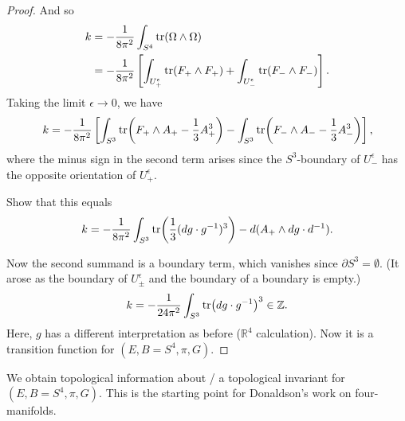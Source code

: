 \begin{proof}
  And so
  \begin{align}
    k &= -\frac{1}{8 \pi^2} \int_{S^4} \tr(\Omega \wedge \Omega) \\
      &= -\frac{1}{8 \pi^2} \left[ \int_{U_+^{\epsilon}} \tr(F_+ \wedge F_+) + \int_{U_-^{\epsilon}} \tr(F_- \wedge F_-) \right].
  \end{align}
  Taking the limit $\epsilon \to 0$, we have
  \begin{equation}
    k = -\frac{1}{8 \pi^2} \left[ \int_{S^3} \tr(F_+ \wedge A_+ - \frac{1}{3} A_+^3) - \int_{S^3} \tr(F_- \wedge A_- - \frac{1}{3} A_-^3) \right],
  \end{equation}
  where the minus sign in the second term arises since the $S^3$-boundary of $U_-^{\epsilon}$ has the opposite orientation of $U_+^{\epsilon}$.
  \begin{exercise}
    Show that this equals
    \begin{equation}
      k = -\frac{1}{8 \pi^2} \int_{S^3} \tr(\frac{1}{3} (dg \cdot g^{-1})^3) - d(A_+ \wedge dg \cdot d^{-1}).
    \end{equation}
  \end{exercise}
  Now the second summand is a boundary term, which vanishes since $\partial S^3 = \emptyset$. (It arose as the boundary of $U_{\pm}^{\epsilon}$ and the boundary of a boundary is empty.)
  \begin{equation}
    k =-\frac{1}{24 \pi^2} \int_{S^3} \tr(dg \cdot g^{-1})^3 \in \mathbb{Z}.
  \end{equation}
  Here, $g$ has a different interpretation as before ($\mathbb{R}^4$ calculation).
  Now it is a transition function for $(E, B = S^4, \pi, G)$.
\end{proof}

We obtain topological information about / a topological invariant for $(E, B = S^4, \pi, G)$. This is the starting point for Donaldson's work on four-manifolds.

